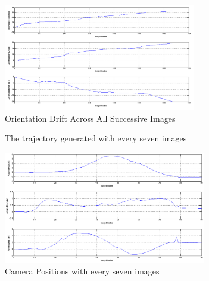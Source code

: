 \documentclass[letter, 10pt]{article}
\begin{document}
\begin{onehalfspacing}
\begin{enumerate}[leftmargin=2em,label={\alph*)}]
\begin{figure}[h!]
	\centering
	\includegraphics[width=0.75\textwidth]{orientation_drift.png}
	\caption{Orientation Drift Across All Successive Images}
	\label{orient_drift}
\end{figure}

\begin{figure}[h!]
	\centering
	\caption{The trajectory generated with every seven images}
	\label{traj_int7}
\end{figure}

\begin{figure}[h!]
	\centering
	\includegraphics[width=0.79\textwidth]{position_adjusted_int7.png}
	\caption{Camera Positions with every seven images}
	\label{pos_int7}
\end{figure}


\end{enumerate}
\end{onehalfspacing}
\end{document}
